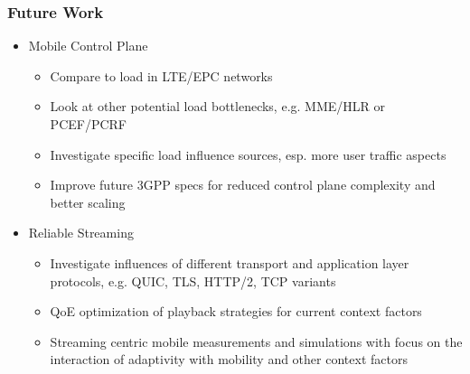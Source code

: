 \documentclass{beamer}
\begin{document}
\begin{frame}
	\frametitle{Future Work}

	\begin{itemize}
		\item Mobile Control Plane
			\begin{itemize}
				\item Compare to load in LTE/EPC networks
				\item Look at other potential load bottlenecks, e.g. MME/HLR or PCEF/PCRF
				\item Investigate specific load influence sources, esp. more user traffic aspects
				\item Improve future 3GPP specs for reduced control plane complexity and better scaling
			\end{itemize}
		\vspace{1em}
		\item Reliable Streaming
		\begin{itemize}
			\item Investigate influences of different transport and application layer protocols, e.g. QUIC, TLS, HTTP/2, TCP variants
			\item QoE optimization of playback strategies for current context factors
			\item Streaming centric mobile measurements and simulations with focus on the interaction of adaptivity with mobility and other context factors
		\end{itemize}
	\end{itemize}

\end{frame}



\end{document}
